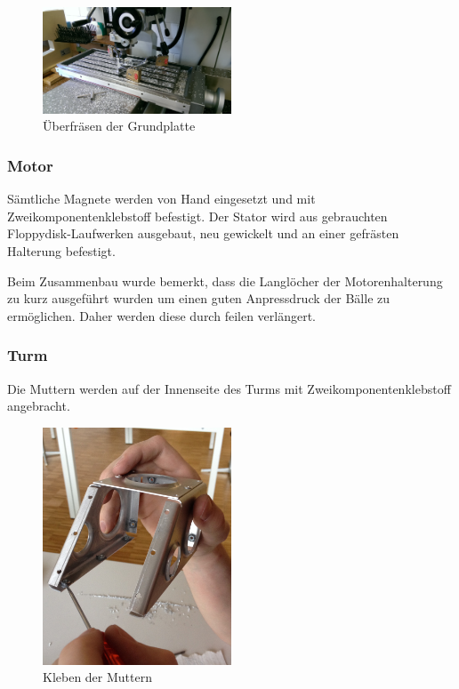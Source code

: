 \begin{figure}[h!]          
	\centering             
	\includegraphics[width=0.5\textwidth]{fig/IMAG0357.jpg}
	\caption{Überfräsen der Grundplatte}
	\label{fig:Grundplatte fräsen}        
\end{figure}

\subsubsection{Motor}
Sämtliche Magnete werden von Hand eingesetzt und mit Zweikomponentenklebstoff befestigt. Der Stator wird aus gebrauchten Floppydisk-Laufwerken ausgebaut, neu gewickelt und an einer gefrästen Halterung befestigt.

Beim Zusammenbau wurde bemerkt, dass die Langlöcher der Motorenhalterung zu kurz ausgeführt wurden um einen guten Anpressdruck der Bälle zu ermöglichen. Daher werden diese durch feilen verlängert.

\subsubsection{Turm}
Die Muttern werden auf der Innenseite des Turms mit Zweikomponentenklebstoff angebracht.

\begin{figure}[h!]          
	\centering             
	\includegraphics[width=0.5\textwidth]{fig/IMG_2292.jpg}
	\caption{Kleben der Muttern}
	\label{fig:Muttern Kleben}        
\end{figure}


